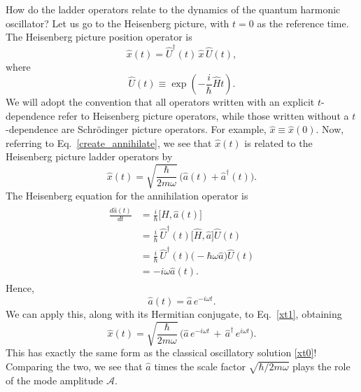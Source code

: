 \documentclass[prx,12pt]{revtex4-2}
\begin{document}
How do the ladder operators relate to the dynamics of the quantum
harmonic oscillator?  Let us go to the Heisenberg picture, with $t =
0$ as the reference time.  The Heisenberg picture position operator is
\begin{equation}
  \hat{x}(t) = \hat{U}^\dagger(t) \,\hat{x}\, \hat{U}(t),
\end{equation}
where
\begin{equation}
  \hat{U}(t) \equiv \exp\left(-\frac{i}{\hbar}\hat{H}t\right).
\end{equation}
We will adopt the convention that all operators written with an
explicit $t$-dependence refer to Heisenberg picture operators, while
those written without a $t$-dependence are Schr\"odinger picture
operators.  For example, $\hat{x} \equiv \hat{x}(0)$.  Now, referring
to Eq.~\eqref{create_annihilate}, we see that $\hat{x}(t)$ is related
to the Heisenberg picture ladder operators by
\begin{equation}
  \hat{x}(t) = \sqrt{\frac{\hbar}{2m\omega}} \, \Big(\hat{a}(t)+\hat{a}^\dagger(t)\Big).
  \label{xt1}
\end{equation}
The Heisenberg equation for the annihilation operator is
\begin{align}
  \begin{aligned}
  \frac{d\hat{a}(t)}{dt} &= \frac{i}{\hbar} \big[\hat{H},\hat{a}(t)\big] \\
  &= \frac{i}{\hbar} \,\hat{U}^\dagger(t) \big[\hat{H},\hat{a}\big] \hat{U}(t) \\
  &= \frac{i}{\hbar} \,\hat{U}^\dagger(t) \Big(-\hbar\omega \hat{a}\Big) \hat{U}(t) \\
  &= -i\omega \hat{a}(t).
  \end{aligned}
  \label{heisenbergeq}
\end{align}
Hence,
\begin{equation}
  \hat{a}(t) = \hat{a} \, e^{-i\omega t}.
  \label{at}
\end{equation}
We can apply this, along with its Hermitian conjugate, to
Eq.~\eqref{xt1}, obtaining
\begin{equation}
  \hat{x}(t) = \sqrt{\frac{\hbar}{2m\omega}} \,
  \Big(\hat{a} \,e^{-i\omega t} \,+\,
  \hat{a}^\dagger\, e^{i\omega t}\Big).
  \label{xtquantum}
\end{equation}
This has exactly the same form as the classical oscillatory solution
\eqref{xt0}!  Comparing the two, we see that $\hat{a}$ times the scale
factor $\sqrt{\hbar/2m\omega}$ plays the role of the mode amplitude
$\mathcal{A}$.
\end{document}
